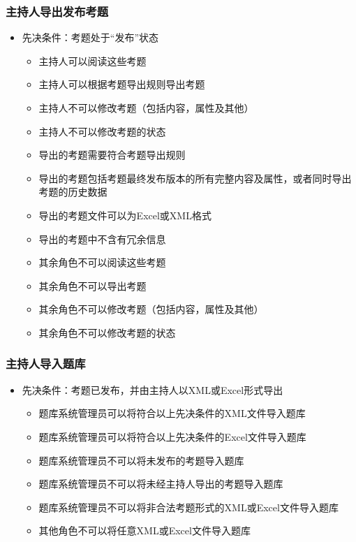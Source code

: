 \documentclass[hyperref, a4paper]{ctexart}
\providecommand{\tightlist}{%
  \setlength{\itemsep}{0pt}\setlength{\parskip}{0pt}}
\begin{document}
\hypertarget{ux4e3bux6301ux4ebaux5bfcux51faux53d1ux5e03ux8003ux9898}{%
\subsubsection{主持人导出发布考题}\label{ux4e3bux6301ux4ebaux5bfcux51faux53d1ux5e03ux8003ux9898}}

\begin{itemize}
\tightlist
\item
  先决条件：考题处于``发布''状态

  \begin{itemize}
  \tightlist
  \item
    主持人可以阅读这些考题
  \item
    主持人可以根据考题导出规则导出考题
  \item
    主持人不可以修改考题（包括内容，属性及其他）
  \item
    主持人不可以修改考题的状态
  \item
    导出的考题需要符合考题导出规则
  \item
    导出的考题包括考题最终发布版本的所有完整内容及属性，或者同时导出考题的历史数据
  \item
    导出的考题文件可以为Excel或XML格式
  \item
    导出的考题中不含有冗余信息
  \item
    其余角色不可以阅读这些考题
  \item
    其余角色不可以导出考题
  \item
    其余角色不可以修改考题（包括内容，属性及其他）
  \item
    其余角色不可以修改考题的状态
  \end{itemize}
\end{itemize}

\hypertarget{ux4e3bux6301ux4ebaux5bfcux5165ux9898ux5e93}{%
\subsubsection{主持人导入题库}\label{ux4e3bux6301ux4ebaux5bfcux5165ux9898ux5e93}}

\begin{itemize}
\tightlist
\item
  先决条件：考题已发布，并由主持人以XML或Excel形式导出

  \begin{itemize}
  \tightlist
  \item
    题库系统管理员可以将符合以上先决条件的XML文件导入题库
  \item
    题库系统管理员可以将符合以上先决条件的Excel文件导入题库
  \item
    题库系统管理员不可以将未发布的考题导入题库
  \item
    题库系统管理员不可以将未经主持人导出的考题导入题库
  \item
    题库系统管理员不可以将非合法考题形式的XML或Excel文件导入题库
  \item
    其他角色不可以将任意XML或Excel文件导入题库
  \end{itemize}
\end{itemize}
\end{document}

